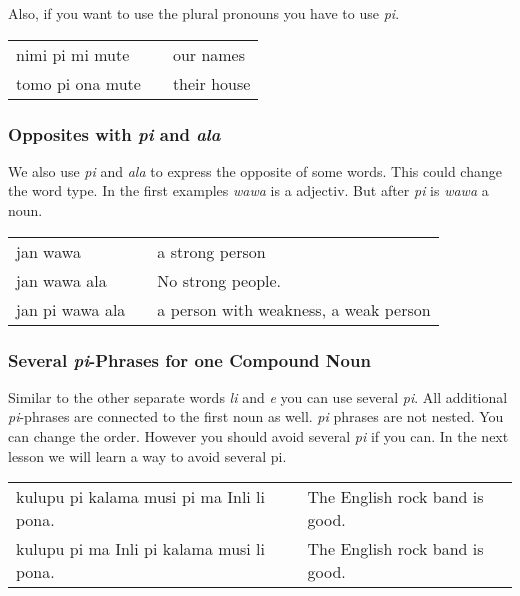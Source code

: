 Also, if you want to use the plural pronouns you have to use \textit{pi}.

\begin{supertabular}{p{5,5cm}|ll}
nimi pi mi mute && our names \\
tomo pi ona mute && their house \\
\end{supertabular}  

\subsubsection*{Opposites with \textit{pi} and \textit{ala}}

We also use \textit{pi} and \textit{ala} to express the opposite of some words. 
This could change the word type. In the first examples \textit{wawa} is a
adjectiv. But after \textit{pi} is \textit{wawa} a noun.

\begin{supertabular}{p{5,5cm}|ll}
jan wawa && a strong person \\
jan wawa ala && No strong people. \\ 
jan pi wawa ala && a person with weakness, a weak person \\
\end{supertabular}  

\subsubsection*{Several \textit{pi}-Phrases for one Compound Noun} 

Similar to the other separate words \textit{li} and \textit{e} you can use several \textit{pi}. 
All additional \textit{pi}-phrases are connected to the first noun as well. 
\textit{pi} phrases are not nested. 
You can change the order. 
However you should avoid several \textit{pi} if you can. 
In the next lesson we will learn a way to avoid several pi.

\begin{supertabular}{p{5,5cm}|ll}
kulupu pi kalama musi pi ma Inli li pona. &&  The English rock band is good. \\ 
kulupu pi ma Inli pi kalama musi li pona. &&  The English rock band is good. \\ 
\end{supertabular}

